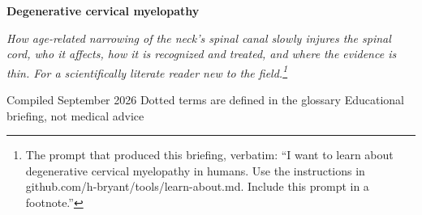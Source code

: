 \documentclass[11pt, letterpaper]{article}
\begin{document}
\begin{center}
  {\headingfont\LARGE\bfseries Degenerative cervical myelopathy\par}\vspace{.7em}
  {\large\itshape How age-related narrowing of the neck's spinal canal slowly injures the spinal cord, who it affects, how it is recognized and treated, and where the evidence is thin. For a scientifically literate reader new to the field.\footnote{The prompt that produced this briefing, verbatim: ``I want to learn about degenerative cervical myelopathy in humans.  Use the instructions in github.com/h-bryant/tools/learn-about.md.  Include this prompt in a footnote.''}\par}\vspace{.7em}
  {\small\sffamily\color{muted}
   Compiled September 2026 \quad\textperiodcentered\quad
   Dotted terms are defined in the glossary \quad\textperiodcentered\quad
   Educational briefing, not medical advice\par}
\end{center}
\vspace{1em}
\end{document}
